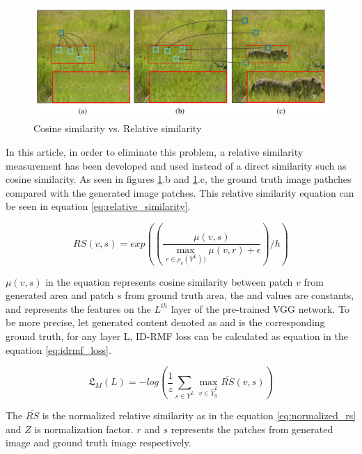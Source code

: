 \begin{figure}[h]
    \centering
    \includegraphics[width=13cm]{figures/chapter4/cosine_similarity.png}
    \caption{Cosine similarity vs. Relative similarity \cite{inpainting_via_multi_cnn}}
    \label{fig:cosine_similarity}
\end{figure}

In this article, in order to eliminate this problem, a relative similarity measurement has been developed and used instead of a direct similarity such as cosine similarity. As seen in figures \ref{fig:cosine_similarity}.b and \ref{fig:cosine_similarity}.c, the ground truth image pathches compared with the generated image patches. This relative similarity equation can be seen in equation \ref{eq:relative_similarity}.

\begin{equation}
    RS(v, s) = exp((\frac{\mu (v, s)}{\max_{r\in \rho_{v} (Y^{L}))} \mu(v,r) + \epsilon }) / h)
    \label{eq:relative_similarity}
\end{equation}

\(\mu (v, s)\) in the equation represents cosine similarity between patch \(v\) from generated area and patch \(s\) from ground truth area, the  and  values are constants, and  represents the features on the \(L^{th}\) layer of the pre-trained VGG network. To be more precise, let generated content denoted as and is the corresponding ground truth, for any layer L, ID-RMF loss can be calculated as equation in the equation \ref{eq:idrmf_loss}.

\begin{equation}
    \mathfrak{L}_{M}(L) = - log(\frac{1}{z} \sum_{s \in Y^{L}} \max_{v \in \widehat{Y}_{g}^{L}} \overline{RS} (v, s))
    \label{eq:idrmf_loss}
\end{equation}

The \(\overline{RS}\) is the normalized relative similarity as in the equation \ref{eq:normalized_rs} and \(Z\) is normalization factor. \(r\) and \(s\) represents the patches from generated image and ground truth image respectively.

